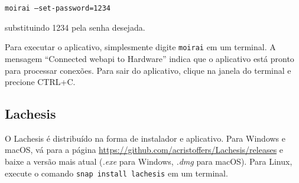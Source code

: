 \texttt{moirai --set-password=1234}

substituindo 1234 pela senha desejada.

Para executar o aplicativo, simplesmente digite \texttt{moirai} em um
terminal. A mensagem \enquote{Connected webapi to Hardware} indica que o
aplicativo está pronto para processar conexões. Para sair do aplicativo, clique
na janela do terminal e precione CTRL+C.

\subsection{Lachesis}%
\label{subsec:install-lachesis}

O Lachesis é distribuído na forma de instalador e aplicativo. Para Windows e
macOS, vá para a página \url{https://github.com/acristoffers/Lachesis/releases}
e baixe a versão mais atual (\textit{.exe} para Windows, \textit{.dmg} para
macOS). Para Linux, execute o comando \texttt{snap install lachesis}
em um terminal.

